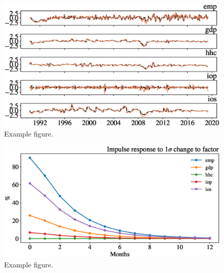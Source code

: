 
\begin{figure}[h]
	\includegraphics[width=\textwidth]{fcasts.eps} 
	\caption{Example figure. \label{fig:example}}
\end{figure}

\begin{figure}[h]
	\includegraphics[width=\textwidth]{df_irfs.eps} 
	\caption{Example figure. \label{fig:example}}
\end{figure}

\newpage
\singlespacing 

%

\onehalfspacing


%
%


\clearpage  
\appendix

\renewcommand{\thefigure}{A\arabic{figure}}
\setcounter{figure}{0}

\renewcommand{\thetable}{A\arabic{table}}
\setcounter{table}{0}


